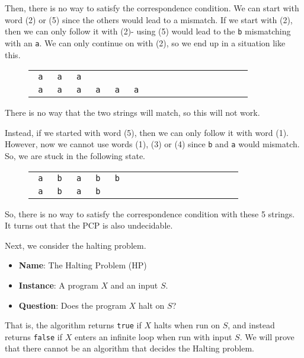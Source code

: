 \documentclass[a4paper, openany]{memoir}
\begin{document}
\noindent Then, there is no way to satisfy the correspondence condition. We can start with word (2) or (5) since the others would lead to a mismatch. If we start with (2), then we can only follow it with (2)- using (5) would lead to the \texttt{b} mismatching with an \texttt{a}. We can only continue on with (2), so we end up in a situation like this.
\begin{figure}[H]
    \centering
    \begin{tabular}{ccccccccccccccccc}
        \texttt{\color{blue} a} & \texttt{\color{red} a} & \texttt{\color{blue} a} \\
        \texttt{\color{blue} a} & \texttt{\color{blue} a} & \texttt{\color{red} a} & \texttt{\color{red} a} & \texttt{\color{blue} a} & \texttt{\color{blue} a}
    \end{tabular}
\end{figure}
\noindent There is no way that the two strings will match, so this will not work.

Instead, if we started with word (5), then we can only follow it with word (1). However, now we cannot use words (1), (3) or (4) since \texttt{b} and \texttt{a} would mismatch. So, we are stuck in the following state.
\begin{figure}[H]
    \centering
    \begin{tabular}{ccccccccccccccccc}
        \texttt{\color{blue} a} & \texttt{\color{blue} b} & \texttt{\color{blue} a} & \texttt{\color{red} b} & \texttt{\color{red} b} \\
        \texttt{\color{blue} a} & \texttt{\color{red} b} & \texttt{\color{red} a} & \texttt{\color{red} b}
    \end{tabular}
\end{figure}
\noindent So, there is no way to satisfy the correspondence condition with these 5 strings. It turns out that the PCP is also undecidable.

Next, we consider the halting problem.
\begin{itemize}
    \item \textbf{Name}: The Halting Problem (HP)
    \item \textbf{Instance}: A program $X$ and an input $S$.
    \item \textbf{Question}: Does the program $X$ halt on $S$?
\end{itemize}
That is, the algorithm returns \texttt{true} if $X$ halts when run on $S$, and instead returns \texttt{false} if $X$ enters an infinite loop when run with input $S$. We will prove that there cannot be an algorithm that decides the Halting problem.
\end{document}
